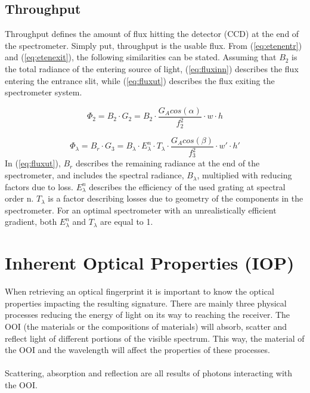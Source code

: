\subsection{Throughput} \label{sec:tput}
Throughput defines the amount of flux hitting the detector (CCD) at the end of the spectrometer. Simply put, throughput is the usable flux. From (\ref{eq:etenentr}) and (\ref{eq:etenexit}), the following similarities can be stated. Assuming that $B_2$ is the total radiance of the entering source of light, (\ref{eq:fluxinn}) describes the flux entering the entrance slit, while (\ref{eq:fluxut}) describes the flux exiting the spectrometer system. 

\begin{equation}
    \Phi_2 = B_2 \cdot G_2 = B_2 \cdot \frac{G_A cos(\alpha)}{f_2^2} \cdot w \cdot h
    \label{eq:fluxinn}
\end{equation}

\begin{equation}
    \Phi_{\lambda} = B_{r} \cdot G_3 = B_{\lambda}\cdot E_{\lambda}^n \cdot T_{\lambda} \cdot \frac{G_A cos(\beta)}{f_3^2} \cdot w' \cdot h'
    \label{eq:fluxut}
\end{equation}
\noindent
In (\ref{eq:fluxut}), $B_{r}$ describes the remaining radiance at the end of the spectrometer, and includes the spectral radiance, $B_{\lambda}$,  multiplied with reducing factors due to loss. $E_{\lambda}^n$ describes the efficiency of the used grating at spectral order n. $T_{\lambda}$ is a factor describing losses due to geometry of the components in the spectrometer. For an optimal spectrometer with an unrealistically efficient gradient, both $E_{\lambda}^n$ and $T_{\lambda}$ are equal to 1.


\vspace{1.3cm}
\section{Inherent Optical Properties (IOP)}
When retrieving an optical fingerprint it is important to know the optical properties impacting the resulting signature. There are mainly three physical processes reducing the energy of light on its way to reaching the receiver. The OOI (the materials or the compositions of materials) will absorb, scatter and reflect light of different portions of the visible spectrum. This way, the material of the OOI and the wavelength will affect the properties of these processes. 
\\\\
Scattering, absorption and reflection are all results of photons interacting with the OOI. 
